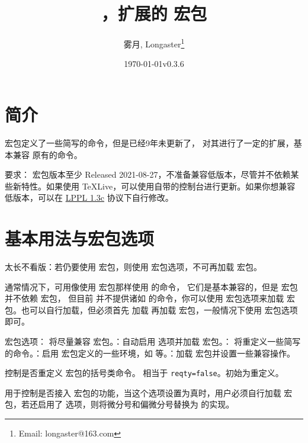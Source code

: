 \documentclass{ctxdoc}
\author{雾月, Longaster\thanks{Email: longaster@163.com}}
\title{\pkg{physicx}，扩展的 \pkg{physics} 宏包}
\date{\today\quad v0.3.6}
\def\emph#1{\textcolor{red!80!black}{#1}}
\begin{document}
\maketitle

\tableofcontents


\section{简介}

 宏包定义了一些简写的命令，但是已经9年未更新了， 对其进行了一定的扩展，基本兼容  原有的命令。

要求： 宏包版本至少 Released 2021-08-27，\emph{不准备兼容低版本}，尽管并不依赖某些新特性。如果使用 TeXLive，可以使用自带的控制台进行更新。如果你想兼容低版本，可以在 \href{http://www.latex-project.org/lppl.txt}{LPPL 1.3c} 协议下自行修改。

\section{基本用法与宏包选项}

\emph{太长不看版}：若仍要使用  宏包，则使用  宏包选项，\emph{不可}再加载  宏包。

通常情况下，可用像使用  宏包那样使用  的命令，
它们是基本兼容的，但是  宏包并不依赖  宏包，
但目前  并不提供诸如  的命令，你可以使用  
宏包选项来加载  宏包。也可以自行加载，但必须首先
加载  再加载  宏包，一般情况下使用  
宏包选项即可。

宏包选项： 将尽量兼容  宏包。：自动启用  选项并加载  宏包。： 将重定义一些简写的命令。：启用  宏包定义的一些环境，如  等。：加载  宏包并设置一些兼容操作。

 控制是否重定义  宏包的括号类命令。 相当于 \verb|reqty=false|。初始为重定义。

 用于控制是否接入  宏包的功能，当这个选项设置为真时，用户必须自行加载  宏包，若还启用了  选项，则将微分号和偏微分号替换为  的实现。
\end{document}
